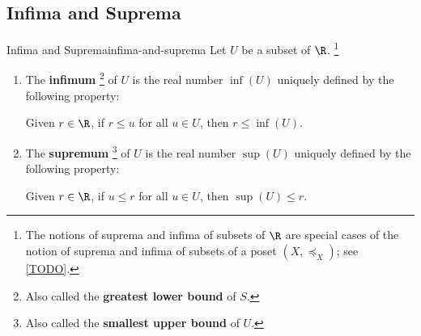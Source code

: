 \subsection{Infima and Suprema}\label{subsection-infima-and-suprema}
\begin{definition}{Infima and Suprema}{infima-and-suprema}%
    Let $U$ be a subset of $\R$.%
    \footnote{%
        The notions of suprema and infima of subsets of $\R$ are special cases of the notion of suprema and infima of subsets of a poset $(X,\preceq_{X})$; see \cref{TODO}.
        \par\vspace*{\TCBBoxCorrection}
    }%
    \begin{enumerate}
        \item\label{infima-and-suprema-infima}The \textbf{infimum}%
            \footnote{%
                Also called the \textbf{greatest lower bound} of $S$.
                \par\vspace*{\TCBBoxCorrection}
            } %
            of $U$ is the real number $\inf(U)$ uniquely defined by the following property:
            \begin{itemize}
                \itemstar Given $r\in\R$, if $r\leq u$ for all $u\in U$, then $r\leq\inf(U)$.
            \end{itemize}
        \item\label{infima-and-suprema-suprema}The \textbf{supremum}%
            \footnote{%
                Also called the \textbf{smallest upper bound} of $U$.
                \par\vspace*{\TCBBoxCorrection}
            } %
            of $U$ is the real number $\sup(U)$ uniquely defined by the following property:
            \begin{itemize}
                \itemstar Given $r\in\R$, if $u\leq r$ for all $u\in U$, then $\sup(U)\leq r$.
            \end{itemize}
    \end{enumerate}
\end{definition}
